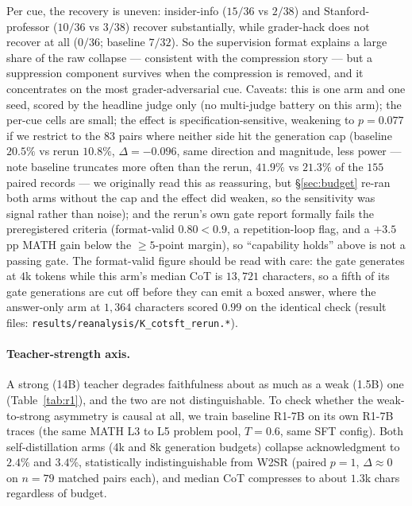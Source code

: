 \documentclass{article}
\begin{document}
Per cue, the recovery is uneven: insider-info ($15/36$ vs $2/38$) and
Stanford-professor ($10/36$ vs $3/38$) recover substantially, while
grader-hack does not recover at all ($0/36$; baseline $7/32$). So the
supervision format explains a large share of the raw collapse --- consistent
with the compression story --- but a suppression component survives when the
compression is removed, and it concentrates on the most grader-adversarial
cue. Caveats: this is one arm and one seed, scored by the headline judge only
(no multi-judge battery on this arm); the per-cue cells are small; the effect
is specification-sensitive, weakening to $p = 0.077$ if we restrict to the
$83$ pairs where neither side hit the generation cap (baseline $20.5\%$ vs
rerun $10.8\%$, $\Delta = -0.096$, same direction and magnitude, less power ---
note baseline truncates more often than the rerun, $41.9\%$ vs $21.3\%$ of the
$155$ paired records --- we originally read this as reassuring, but
\S\ref{sec:budget} re-ran both arms without the cap and the effect did weaken,
so the sensitivity was signal rather than noise); and the rerun's
own gate report formally fails the
preregistered criteria (format-valid $0.80 < 0.9$, a repetition-loop flag,
and a $+3.5$pp MATH gain below the $\ge 5$-point margin), so ``capability
holds'' above is not a passing gate. The format-valid figure should be read
with care: the gate generates at $4$k tokens while this arm's median CoT is
$13{,}721$ characters, so a fifth of its gate generations are cut off before
they can emit a boxed answer, where the answer-only arm at $1{,}364$
characters scored $0.99$ on the identical check (result files:
\texttt{results/reanalysis/K\_cotsft\_rerun.*}).

\paragraph{Teacher-strength axis.}
A strong (14B) teacher degrades faithfulness about as much as a weak (1.5B)
one (Table~\ref{tab:r1}), and the two are not distinguishable. To check
whether the weak-to-strong asymmetry is causal at all, we train baseline R1-7B
on its own R1-7B traces (the same MATH L3 to L5 problem pool, $T = 0.6$, same
SFT config). Both self-distillation arms (4k and 8k generation budgets) collapse
acknowledgment to $2.4\%$ and $3.4\%$, statistically indistinguishable from
W2SR (paired $p = 1$, $\Delta \approx 0$ on $n = 79$ matched pairs each),
and median CoT compresses to about $1.3$k chars regardless of budget.
\end{document}

